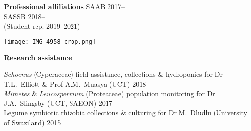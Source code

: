 \documentclass[10pt]{article}
\begin{document}
\begin{multicols}{2}
\begin{multicols}{2}
  \textbf{Professional affiliations} %
  SAAB                       \hfill {\small 2017--\hspace*{2.5em}} \\
  SASSB                      \hfill {\small 2018--\hspace*{2.5em}} \\
  \hspace{1em} (Student rep. \hfill {\small 2019--2021})
  \vfill
  \columnbreak
  \begin{center}
    \texttt{[image: IMG\_4958\_crop.png]}
  \end{center}
\end{multicols}

\end{multicols} %

\textbf{Research assistance} %

\textit{Schoenus} (Cyperaceae)
  field assistance, collections \& hydroponics
  for Dr T.L.~Elliott \& Prof A.M.~Muasya
  {\small (UCT)}                                         \hfill {\small 2018} \\
\textit{Mimetes} \& \textit{Leucospermum} (Proteaceae)
  population monitoring
  for Dr J.A.~Slingsby
  {\small (UCT, SAEON)}                                  \hfill {\small 2017} \\
Legume symbiotic rhizobia
  collections \& culturing
  for Dr M.~Dludlu
  {\small (University of Swaziland)}                     \hfill {\small 2015}
\end{document}
